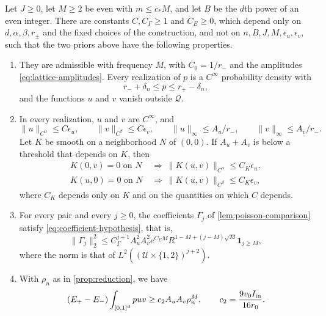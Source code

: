 \begin{lemma}\label{lem:lattice-priors}
\label{lat:smoothness}\label{lat:coefficients}\label{lat:separation}
Let $J\ge0$, let $M\ge2$ be even with $m\le c_*M$, and let $B$ be the
$d$th power of an even integer. There are constants $C,C_\Gamma\ge1$
and $C_E\ge0$, which depend only on $d,\alpha,\beta,r_\pm$ and the
fixed choices of the construction, and not on
$n,B,J,M,\epsilon_u,\epsilon_v$, such that the two priors above have
the following properties.
\begin{enumerate}[label=(\alph*)]
\item They are admissible with frequency $M$, with $C_0=1/r_-$ and the
amplitudes \eqref{eq:lattice-amplitudes}. Every realization of $p$ is
a $C^\infty$ probability density with
\begin{equation}\label{eq:lower-density-margin}
 r_-+\delta_n\le p\le r_+-\delta_n,
\end{equation}
and the functions $u$ and $v$ vanish outside $\mathcal Q$.
\item In every realization, $u$ and $v$ are $C^\infty$, and
\begin{equation}\label{eq:lower-norms}
 \|u\|_{C^\alpha}\le C\epsilon_u,\qquad
 \|v\|_{C^\beta}\le C\epsilon_v,\qquad
 \|u\|_\infty\le A_u/r_-,\qquad \|v\|_\infty\le A_v/r_-.
\end{equation}
Let $K$ be smooth on a neighborhood $N$ of $(0,0)$. If $A_u+A_v$ is
below a threshold that depends on $K$, then
\begin{equation}\label{eq:lower-smooth-map}
\begin{aligned}
 K(0,v)=0\text{ on }N&\ \Longrightarrow\
       \|K(u,v)\|_{C^\alpha}\le C_K\epsilon_u,\\
 K(u,0)=0\text{ on }N&\ \Longrightarrow\
       \|K(u,v)\|_{C^\beta}\le C_K\epsilon_v,
\end{aligned}
\end{equation}
where $C_K$ depends only on $K$ and on the quantities on which $C$
depends.
\item For every pair and every $j\ge0$, the coefficients $\Gamma_j$ of
\cref{lem:poisson-comparison} satisfy
\eqref{eq:coefficient-hypothesis}, that is,
\[
 \|\Gamma_j\|_2^2\le C_\Gamma^{j+1}A_u^2A_v^2
 e^{C_EM}R^{1-M+(j-M)\sqrt M}\mathbf 1_{j\ge M},
\]
where the norm is that of $L^2((\mathcal U\times\{1,2\})^{j+2})$.
\item With $\rho_n$ as in \cref{prop:reduction}, we have
\[
 (E_+-E_-)\int_{[0,1]^d}puv\ge c_2A_uA_v\rho_n^M,
 \qquad c_2=\frac{9v_0I_{\rm in}}{16r_0}.
\]
\end{enumerate}
\end{lemma}

